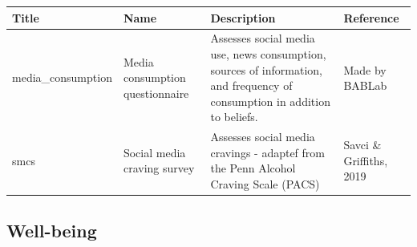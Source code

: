 \documentclass[]{book}
\begin{document}
\begin{longtable}[]{@{}llll@{}}
\toprule
\begin{minipage}[b]{0.22\columnwidth}\raggedright
Title\strut
\end{minipage} & \begin{minipage}[b]{0.27\columnwidth}\raggedright
Name\strut
\end{minipage} & \begin{minipage}[b]{0.22\columnwidth}\raggedright
Description\strut
\end{minipage} & \begin{minipage}[b]{0.18\columnwidth}\raggedright
Reference\strut
\end{minipage}\tabularnewline
\midrule
\endhead
\begin{minipage}[t]{0.22\columnwidth}\raggedright
media\_consumption\strut
\end{minipage} & \begin{minipage}[t]{0.27\columnwidth}\raggedright
Media consumption questionnaire\strut
\end{minipage} & \begin{minipage}[t]{0.22\columnwidth}\raggedright
Assesses social media use, news consumption, sources of information, and frequency of consumption in addition to beliefs.\strut
\end{minipage} & \begin{minipage}[t]{0.18\columnwidth}\raggedright
Made by BABLab\strut
\end{minipage}\tabularnewline
\begin{minipage}[t]{0.22\columnwidth}\raggedright
smcs\strut
\end{minipage} & \begin{minipage}[t]{0.27\columnwidth}\raggedright
Social media craving survey\strut
\end{minipage} & \begin{minipage}[t]{0.22\columnwidth}\raggedright
Assesses social media cravings - adaptef from the Penn Alcohol Craving Scale (PACS)\strut
\end{minipage} & \begin{minipage}[t]{0.18\columnwidth}\raggedright
Savci \& Griffiths, 2019\strut
\end{minipage}\tabularnewline
\bottomrule
\end{longtable}

\hypertarget{well-being}{%
\subsection{Well-being}\label{well-being}}
\end{document}
